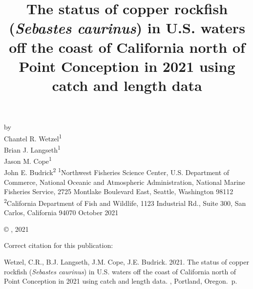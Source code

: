 \documentclass[11pt,
  english,
  a4paper,
]{article}
\date{}
\newcommand{\trTitle}{The status of copper rockfish (\emph{Sebastes caurinus}) in U.S. waters off the coast of California north of Point Conception in 2021 using catch and length data}
\newcommand{\trYear}{2021}
\newcommand{\trMonth}{October}
\newcommand{\trAuthsBack}{Wetzel, C.R., B.J. Langseth, J.M. Cope, J.E. Budrick}
\newcommand{\trCitation}{
\begin{hangparas}{1em}{1}
\trAuthsBack{}. \trYear{}. \trTitle{}. \glsentrylong{pfmc}, Portland, Oregon. \pageref{LastPage}{}\,p.
\end{hangparas}}
\begin{document}

\renewcommand*{\thefootnote}{\fnsymbol{footnote}}

\small
\thispagestyle{empty}
\noindent
\begin{center}
\title{The status of copper rockfish (\emph{Sebastes caurinus}) in U.S. waters off the coast of California north of Point Conception in 2021 using catch and length data}
\vspace{1.5cm}
{\Large\textbf{}}
\vfill
by\\
Chantel R. Wetzel\textsuperscript{1}\\
Brian J. Langseth\textsuperscript{1}\\
Jason M. Cope\textsuperscript{1}\\
John E. Budrick\textsuperscript{2}\vfill
\textsuperscript{1}Northwest Fisheries Science Center, U.S. Department of Commerce, National Oceanic and Atmospheric Administration, National Marine Fisheries Service, 2725 Montlake Boulevard East, Seattle, Washington 98112\\
\textsuperscript{2}California Department of Fish and Wildlife, 1123 Industrial Rd., Suite 300, San Carlos, California 94070\vfill
\trMonth{} \trYear{}
\end{center}
\clearpage

\thispagestyle{empty}
\vspace*{\fill}
\begin{center}
\copyright{} , \trYear{}\\
\end{center}
\par
\bigskip
\noindent
Correct citation for this publication:
\bigskip
\par
\trCitation{}
\clearpage


\tableofcontents\clearpage
\label{TRlastRoman}
\clearpage

\newpage
\thispagestyle{empty} %

\pagestyle{plain}  %
\renewcommand*{\thefootnote}{\arabic{footnote}}  %
\setcounter{footnote}{0}  %
\renewcommand{\headrulewidth}{0.5pt}
\renewcommand{\footrulewidth}{0.5pt}
\end{document}
